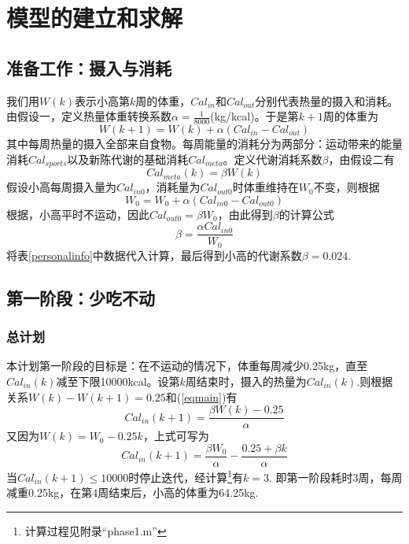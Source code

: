 \documentclass[a4paper,12pt,onecolumn,twoside]{article}
\begin{document}
\section{模型的建立和求解}
\subsection{准备工作：摄入与消耗\label{sensitivity:beta}}
我们用$W(k)$表示小高第$k$周的体重，$Cal_{in}$和$Cal_{out}$分别代表热量的摄入和消耗。由假设一，定义热量体重转换系数$\alpha=\frac{1}{8000}$(kg/kcal)。于是第$k+1$周的体重为
\begin{equation}\label{eqmain}
	W(k+1)=W(k)+\alpha(Cal_{in}-Cal_{out})
\end{equation}
其中每周热量的摄入全部来自食物。每周能量的消耗分为两部分：运动带来的能量消耗$Cal_{sports}$以及新陈代谢的基础消耗$Cal_{meta}$。定义代谢消耗系数$\beta$，由假设二有
\begin{equation}
	Cal_{meta}(k)=\beta W(k)
\end{equation}
假设小高每周摄入量为$Cal_{in0}$，消耗量为$Cal_{out0}$时体重维持在$W_{0}$不变，则根据
\begin{equation}
	W_{0}=W_{0}+\alpha(Cal_{in0}-Cal_{out0})
\end{equation}
根据，小高平时不运动，因此$Cal_{out0}=\beta W_{0}$，由此得到$\beta$的计算公式
\begin{equation}\label{def:beta}
	\beta=\frac{\alpha Cal_{in0}}{W_{0}}
\end{equation}
将表\ref{personalinfo}中数据代入计算，最后得到小高的代谢系数$\beta=0.024$.
\subsection{第一阶段：少吃不动}
\subsubsection{总计划}
本计划第一阶段的目标是：在不运动的情况下，体重每周减少0.25kg，直至$Cal_{in}(k)$减至下限10000kcal。设第$k$周结束时，摄入的热量为$Cal_{in}(k)$.则根据关系$W(k)-W(k+1)=0.25$和(\ref{eqmain})有
\begin{equation}
	Cal_{in}(k+1)=\frac{\beta W(k)-0.25}{\alpha}
\end{equation}
又因为$W(k)=W_{0}-0.25k$，上式可写为
\begin{equation}\label{sensi:1}
	Cal_{in}(k+1)=\frac{\beta W_{0}}{\alpha}-\frac{0.25+\beta k}{\alpha}
\end{equation}
当$Cal_{in}(k+1)\leq 10000$时停止迭代，经计算\footnote{计算过程见附录“phase1.m”}有$k=3$. 即第一阶段耗时3周，每周减重0.25kg，在第4周结束后，小高的体重为64.25kg.
\end{document}
